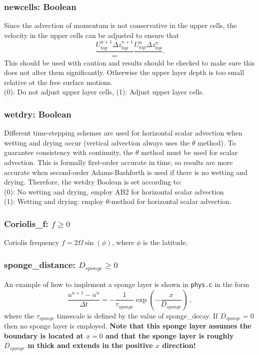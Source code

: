 \documentclass[12pt,oneside]{article}
\begin{document}
\subsubsection{newcells: Boolean}

Since the advection of momentum is not conservative in the upper cells, the velocity in the upper cells
can be adjusted to ensure that
\[
\frac{U_{top}^{n+1}\Delta z_{top}^{n+1}} = 
\frac{U_{top}^{n}\Delta z_{top}^{n}}\,.
\]
This should be used with caution and results should be checked to make sure this does not alter them
significantly.  Otherwise the upper layer depth is too small relative ot the free surface motions.\\
(0): Do not adjust upper layer cells, (1): Adjust upper layer cells.

\subsubsection{wetdry: Boolean}

Different time-stepping schemes are used for horizontal scalar advection when wetting and drying occur (vertical
advection always uses the $\theta$ method).  To guarantee consistency
with continuity, the $\theta$ method must be used for scalar advection.  This is formally first-order
accurate in time, so results are more accurate when second-order Adams-Bashforth is used if there
is no wetting and drying.  Therefore, the wetdry Boolean is set according to:\\
(0): No wetting and drying, employ AB2 for horizontal scalar advection\\
(1): Wetting and drying: employ $\theta$-method for horizontal scalar advection.

\subsubsection{Coriolis\_f: $f\ge 0$}

Coriolis frequency $f=2\Omega\sin(\phi)$, where $\phi$ is the latitude.

\subsubsection{sponge\_distance: $D_{sponge}\ge 0$}

An example of how to implement a sponge layer is shown in \verb+phys.c+ in the form
\[
\frac{u^{n+1}-u^n}{\Delta t} = -\frac{1}{\tau_{sponge}}\exp\left(-\frac{x}{D_{sponge}}\right)\,,
\]
where the $\tau_{sponge}$ timescale is defined by the value of sponge\_decay.  If $D_{sponge}=0$ then
no sponge layer is employed.  {\bf Note that this sponge layer assumes the boundary is located at $x=0$
and that the sponge layer is roughly $D_{sponge}$ m thick and extends in the positive $x$ direction!}
\end{document}
